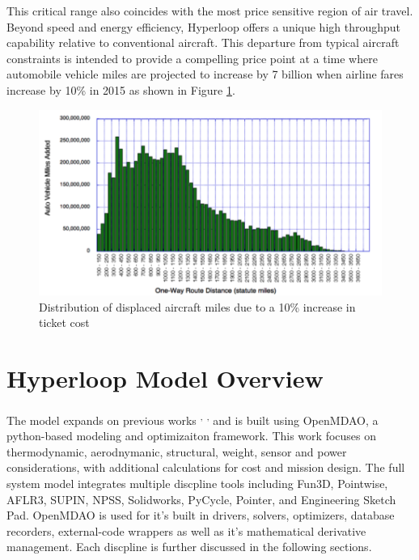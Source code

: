 \documentclass[heading.tex]{subfiles}
\begin{document}
	This critical range also coincides with the
	most price sensitive region of air travel.
	Beyond speed and energy efficiency,
	Hyperloop offers a unique high throughput
	capability relative to conventional aircraft.
	This departure from typical aircraft constraints
	is intended to provide a compelling price point
	at a time where automobile vehicle miles are
	projected to increase by 7 billion when airline
	fares increase by 10\% in 2015 as shown in Figure \ref{f:price}.

	\begin{figure}[hbtp]
		\centering
		\includegraphics[width=.75\textwidth]{images/price.png}
		\caption[price]{Distribution of displaced aircraft miles due to a 10\% increase in ticket cost}
		\label{f:price}
	\end{figure}


\section{Hyperloop Model Overview}

	The model expands on previous works \cite{Chin} \textsuperscript{,}
	\cite{goodwin2009cantera}\textsuperscript{,} \cite{GrayBenchmarking2013}
	and is built using OpenMDAO, a python-based modeling and optimizaiton framework.
	This work focuses on thermodynamic, aerodnymanic, structural,
	weight, sensor and power considerations, with additional calculations for cost
	and mission design. The full system model integrates multiple discpline tools
	including Fun3D, Pointwise, AFLR3, SUPIN, NPSS, Solidworks, PyCycle, Pointer,
	and Engineering Sketch Pad. OpenMDAO is used for it's built in drivers, solvers,
	optimizers, database recorders, external-code wrappers as well as it's
	mathematical derivative management. Each discpline is further discussed in the
	following sections.

	

	\label{s:struct}
\end{document}
